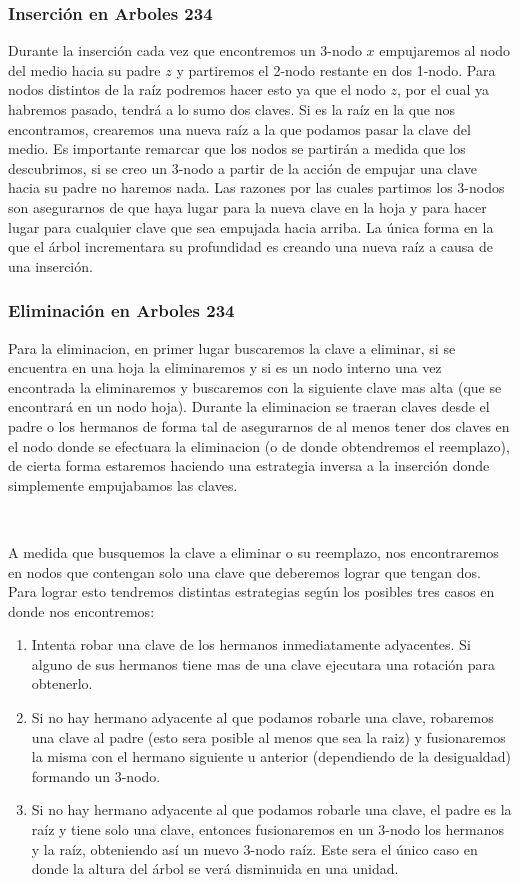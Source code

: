 \documentclass[10pt, a4paper]{report}
\begin{document}
\subsubsection{Inserci\'on en Arboles 234}

Durante la inserci\'on cada vez que encontremos un 3-nodo $x$ empujaremos al nodo del medio hacia su padre $z$ y partiremos el 2-nodo restante en dos 1-nodo. Para nodos distintos de la ra\'iz podremos hacer esto ya que el nodo $z$, por el cual ya habremos pasado, tendr\'a a lo sumo dos claves.  Si es la ra\'iz en la que nos encontramos, crearemos una nueva ra\'iz a la que podamos pasar la clave del medio. Es importante remarcar que los nodos se partir\'an a medida que los descubrimos, si se creo un 3-nodo a partir de la acci\'on de empujar una clave hacia su padre no haremos nada. Las razones por las cuales partimos los 3-nodos son asegurarnos de que haya lugar para la nueva clave en la hoja y para hacer lugar para cualquier clave que sea empujada hacia arriba. La \'unica forma en la que el \'arbol incrementara su profundidad es creando una nueva ra\'iz a causa de una inserci\'on.

\subsubsection{Eliminaci\'on en Arboles 234}

Para la eliminacion, en primer lugar buscaremos la clave a eliminar, si se encuentra en una hoja la eliminaremos y si es un nodo interno una vez encontrada la eliminaremos y buscaremos con la siguiente clave mas alta (que se encontrar\'a en un nodo hoja). Durante la eliminacion se traeran claves desde el padre o los hermanos de forma tal de asegurarnos de al menos tener dos claves en el nodo donde se efectuara la eliminacion (o de donde obtendremos el reemplazo), de cierta forma estaremos haciendo una estrategia inversa a la inserci\'on donde simplemente empujabamos las claves.

~

A medida que busquemos la clave a eliminar o su reemplazo, nos encontraremos en nodos que contengan solo una clave que deberemos lograr que tengan dos. Para lograr esto tendremos distintas estrategias seg\'un los posibles tres casos en donde nos encontremos:

\begin{enumerate}
 \item Intenta robar una clave de los hermanos inmediatamente adyacentes. Si alguno de sus hermanos tiene mas de una clave ejecutara una rotaci\'on para obtenerlo.
 \item Si no hay hermano adyacente al que podamos robarle una clave, robaremos una clave al padre (esto sera posible al menos que sea la raiz) y fusionaremos la misma con el hermano siguiente u anterior (dependiendo de la desigualdad) formando un 3-nodo.
 \item Si no hay hermano adyacente al que podamos robarle una clave, el padre es la ra\'iz y tiene solo una clave, entonces fusionaremos en un 3-nodo los hermanos y la ra\'iz, obteniendo as\'i un nuevo 3-nodo ra\'iz. Este sera el \'unico caso en donde la altura del \'arbol se ver\'a disminuida en una unidad.
\end{enumerate}
\end{document}
